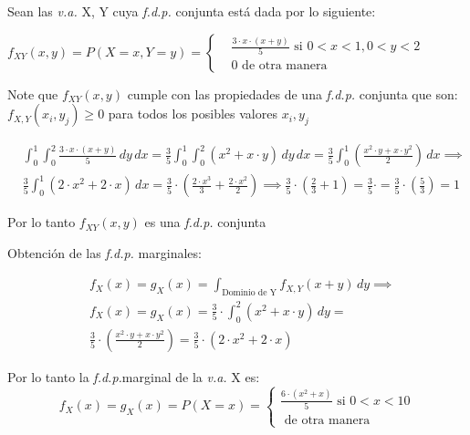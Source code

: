 \begin{problem}
Sean las \textit{v.a.} X, Y cuya \textit{f.d.p.} conjunta está dada por lo siguiente:

$f_{XY}\left(x,y\right)=P\left( X=x ,Y= y\right) =\begin{cases}
    & \frac{3\cdot x\cdot \left(  x+ y\right) }{5}\text{ si } 0< x<1, 0< y<2 \\
    & 0\text{ de otra manera }
\end{cases}$

Note que $f_{XY}\left( x,y\right)$  cumple con las propiedades de una \textit{f.d.p.} conjunta que son:
$f_{X ,Y} \left( x_i, y_j\right) \geq 0$ para todos los posibles valores
$x_i, y_j$

\begin{align*}
    &\int_0^1\int_0^2\frac{3\cdot x\cdot \left( x+ y\right)}{5} \,dy\,dx=\frac{3}{5}\int_0^1\int_0^2\left( x^2+x\cdot y \right) \,dy\,dx=\frac{3}{5}\int_0^1\left(\frac{x^2\cdot y+x\cdot y^2}{2}\right)\,dx\implies\\
    &\frac{3}{5}\int_0^1\left( 2\cdot x^2+2\cdot x\right) \,dx=\frac{3}{5}\cdot \left(\frac{2\cdot x^3}{3}+\frac{2\cdot x^2}{2}\right) \implies\frac{3}{5}\cdot \left(\frac{2}{3}+1\right) =\frac{3}{5}\cdot=\frac{3}{5}\cdot\left(\frac{5}{3}\right) =1
\end{align*}

Por lo tanto $f_{XY}\left( x,y\right)$  es una \textit{f.d.p.} conjunta
\end{problem}

Obtención de las \textit{f.d.p.} marginales:

\begin{align*}
    &f_X\left( x \right) =g_X \left(x\right)=\int_{\text{Dominio de Y}}f_{X ,Y} \left(x+y\right)\,dy\implies\\
    &f_X\left( x \right) =g_X \left(x\right) =\frac{3}{5}\cdot \int_0^2\left(x^2+ x\cdot y \right) \,dy=\\
    &\frac{3}{5}\cdot \left(\frac{x^2\cdot y+x\cdot  y^2}{2}\right)=\frac{3}{5}\cdot \left( 2\cdot x^2+2\cdot x \right)
\end{align*}

Por lo tanto la \textit{f.d.p.}marginal de la \textit{v.a.} X es:
\begin{equation*}
    f_X\left(x\right) =g_X\left(x\right)=P\left(X=x\right)=\begin{cases}\frac{6\cdot \left( x^2+x \right)}{5}\text{ si }0<x<10\\\text{ de otra manera}\end{cases}
\end{equation*}

